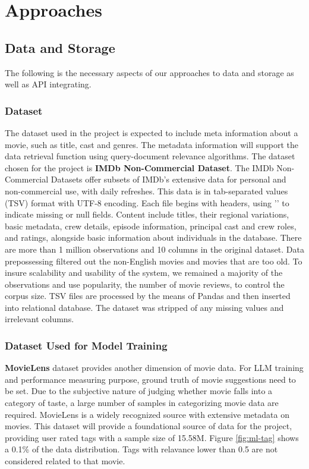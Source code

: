 \documentclass[journal]{IEEEtran}
\theoremstyle{mydefstyle}
\begin{document}
\section{Approaches}
\subsection{Data and Storage}
The following is the necessary aspects of our approaches to data and storage as well as API integrating.

\subsubsection{Dataset}
The dataset used in the project is expected to include meta information about a movie, such as title, cast and genres. The metadata information will support the data retrieval function using query-document relevance algorithms. The dataset chosen for the project is \textbf{IMDb Non-Commercial Dataset}. The IMDb Non-Commercial Datasets offer subsets of IMDb's extensive data for personal and non-commercial use, with daily refreshes. This data is in tab-separated values (TSV) format with UTF-8 encoding. Each file begins with headers, using '\N' to indicate missing or null fields. Content include titles, their regional variations, basic metadata, crew details, episode information, principal cast and crew roles, and ratings, alongside basic information about individuals in the database. There are more than 1 million observations and 10 columns in the original dataset. Data prepossessing filtered out the non-English movies and movies that are too old. To insure scalability and usability of the system, we remained a majority of the observations and use popularity, the number of movie reviews, to control the corpus size. TSV files are processed by the means of Pandas and then inserted into relational database. The dataset was stripped of any missing values and irrelevant columns. 

\subsubsection{Dataset Used for Model Training}
\textbf{MovieLens} dataset provides another dimension of movie data. For LLM training and performance measuring purpose, ground truth of movie suggestions need to be set. Due to the subjective nature of judging whether movie falls into a category of taste, a large number of samples in categorizing movie data are required. MovieLens is a widely recognized source with extensive metadata on movies. This dataset will provide a foundational source of data for the project, providing user rated tags with a sample size of 15.58M. Figure \ref{fig:ml-tag} shows a 0.1\% of the data distribution. Tags with relavance lower than 0.5 are not considered related to that movie.
\end{document}
